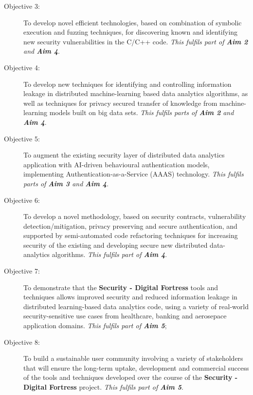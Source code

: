 \documentclass[a4paper,11pt]{article}
\newcommand{\project}[1]{\textbf{#1}\xspace}
\newcommand{\SECURITY}{\project{Security - Digital Fortress}}
\newcommand{\TheProject}{\SECURITY}
\begin{document}
\begin{description}
\item[Objective 3:] To develop novel efficient technologies, based on combination of symbolic execution and fuzzing
  techniques, for discovering known and identifying new security vulnerabilities in the C/C++ code. \emph{This fulfils
    part of \textbf{Aim 2} and \textbf{Aim 4}}.

\item[Objective 4:] To develop new techniques for identifying and controlling information leakage in distributed machine-learning based data analytics algorithms, as well as techniques for privacy secured transfer of knowledge from machine-learning models
  built on big data sets. \emph{This fulfils parts of \textbf{Aim 2} and \textbf{Aim 4}}.

\item[Objective 5:] To augment the existing security layer of distributed data analytics application with AI-driven behavioural authentication models, implementing Authentication-as-a-Service (AAAS) technology. \emph{This fulfils parts of \textbf{Aim 3} and \textbf{Aim 4}}.

\item[Objective 6:] To develop a novel methodology, based on security contracts, vulnerability detection/mitigation,
  privacy preserving and secure authentication, and supported by semi-automated code refactoring techniques for
  increasing security of the existing and developing secure new distributed data-analytics algorithms. \emph{This fulfils
    part of \textbf{Aim 4}}.

\item[Objective 7:] To demonstrate that the \TheProject{} tools and techniques allows improved security and reduced
  information leakage in distributed learning-based data analytics code, using a variety of real-world security-sensitive
  use cases from healthcare, banking and aerosepace application domains. \emph{This fulfils part of \textbf{Aim 5}};

\item[Objective 8:] To build a sustainable user community involving a variety of stakeholders that will ensure the long-term
  uptake, development and commercial success of the tools and techniques developed over the course of the \TheProject{}
  project. \emph{This fulfils part of \textbf{Aim 5}}.

\end{description}
\end{document}
